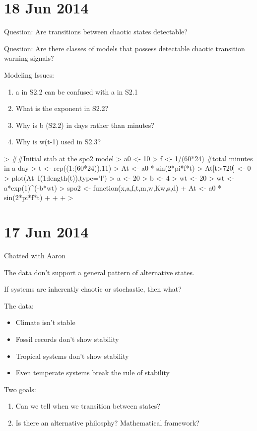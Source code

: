 \documentclass[12pt]{article}
\begin{document}
\section{18 Jun 2014}

Question: Are transitions between chaotic states detectable?

Question: Are there classes of models that possess detectable chaotic
transition warning signals?

Modeling Issues:
\begin{enumerate}
\item a in S2.2 can be confused with a in S2.1
\item What is the exponent in S2.2?
\item Why is b (S2.2) in days rather than minutes?
\item Why is w(t-1) used in S2.3?
\end{enumerate}

\begin{Schunk}
\begin{Sinput}
>   ##Initial stab at the spo2 model
>   a0 <- 10
> f <- 1/(60*24) #total minutes in a day
> t <- rep((1:(60*24)),11)
> At <- a0 * sin(2*pi*f*t)
> At[t>720] <- 0
> plot(At~I(1:length(t)),type='l')
> a <- 20
> b <- 4
> wt <- 20
> wt <- a*exp(1)^(-b*wt)
> spo2 <- function(x,a,f,t,m,w,Kw,s,d){
+   At <- a0 * sin(2*pi*f*t)
+   
+   
+ }
> 
\end{Sinput}
\end{Schunk}



\section{17 Jun 2014}

Chatted with Aaron

The data don't support a general pattern of alternative states.

If systems are inherently chaotic or stochastic, then what?

The data:
\begin{itemize}
\item Climate isn't stable
\item Fossil records don't show stability
\item Tropical systems don't show stability
\item Even temperate systems break the rule of stability
\end{itemize}

Two goals:
\begin{enumerate}
\item Can we tell when we transition between states?
\item Is there an alternative philosphy? Mathematical framework?
\end{enumerate}
\end{document}

